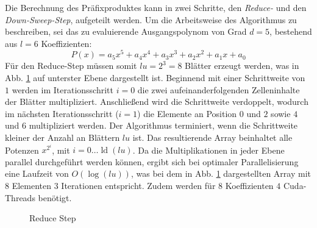 Die Berechnung des Präfixproduktes kann in zwei Schritte, den \textit{Reduce-} und den \textit{Down-Sweep-Step}, aufgeteilt werden. Um die Arbeitsweise des Algorithmus zu beschreiben, sei das zu evaluierende Ausgangspolynom von Grad $d = 5$, bestehend aus $l = 6$ Koeffizienten:
$$P(x) = a_5x^5 + a_4x^4 + a_3x^3 + a_2x^2 + a_1x +a_0$$ 
Für den Reduce-Step müssen somit $lu = 2^3 = 8$ Blätter erzeugt werden, was in Abb. \ref{fig:reduce_step} auf unterster Ebene dargestellt ist. 
Beginnend mit einer Schrittweite von $1$ werden im Iterationsschritt $i=0$ die zwei aufeinanderfolgenden Zelleninhalte der Blätter multipliziert. 
Anschließend wird die Schrittweite verdoppelt, wodurch im nächsten Iterationsschritt ($i=1$) die Elemente an Position $0$ und $2$ sowie $4$ und $6$ multipliziert werden.
Der Algorithmus terminiert, wenn die Schrittweite kleiner der Anzahl an Blättern $lu$ ist.
Das resultierende Array beinhaltet alle Potenzen $x^{2^i}$, mit $i=0 \dots \operatorname{ld}(lu)$. Da die Multiplikationen in jeder Ebene parallel durchgeführt werden können, ergibt sich bei optimaler Parallelisierung eine Laufzeit von $O(\log(lu))$, was bei dem in Abb. \ref{fig:reduce_step} dargestellten Array mit $8$ Elementen $3$ Iterationen entspricht. Zudem werden für $8$ Koeffizienten $4$ Cuda-Threads benötigt.\newline

\begin{figure}
\centering

\caption{Reduce Step} \label{fig:reduce_step}
\end{figure}

